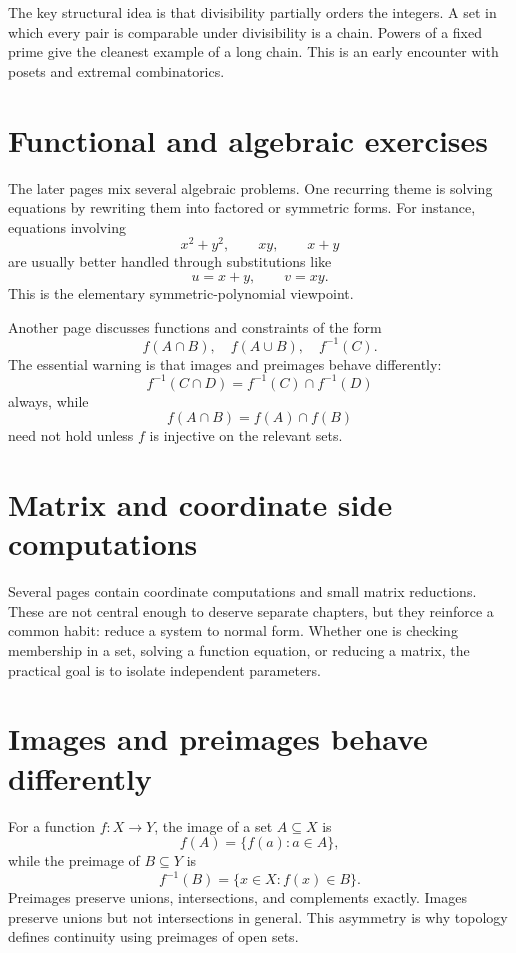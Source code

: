 The key structural idea is that divisibility partially orders the integers.  A set in which every pair is comparable under divisibility is a chain.  Powers of a fixed prime give the cleanest example of a long chain.  This is an early encounter with posets and extremal combinatorics.

\section{Functional and algebraic exercises}

The later pages mix several algebraic problems.  One recurring theme is solving equations by rewriting them into factored or symmetric forms.  For instance, equations involving
\[
  x^2+y^2,\qquad xy,\qquad x+y
\]
are usually better handled through substitutions like
\[
  u=x+y,\qquad v=xy.
\]
This is the elementary symmetric-polynomial viewpoint.

Another page discusses functions and constraints of the form
\[
  f(A\cap B),\quad f(A\cup B),\quad f^{-1}(C).
\]
The essential warning is that images and preimages behave differently:
\[
  f^{-1}(C\cap D)=f^{-1}(C)\cap f^{-1}(D)
\]
always, while
\[
  f(A\cap B)=f(A)\cap f(B)
\]
need not hold unless \(f\) is injective on the relevant sets.

\section{Matrix and coordinate side computations}

Several pages contain coordinate computations and small matrix reductions.  These are not central enough to deserve separate chapters, but they reinforce a common habit: reduce a system to normal form.  Whether one is checking membership in a set, solving a function equation, or reducing a matrix, the practical goal is to isolate independent parameters.


\section{Images and preimages behave differently}

For a function \(f:X\to Y\), the image of a set \(A\subseteq X\) is
\[
  f(A)=\{f(a):a\in A\},
\]
while the preimage of \(B\subseteq Y\) is
\[
  f^{-1}(B)=\{x\in X:f(x)\in B\}.
\]
Preimages preserve unions, intersections, and complements exactly.  Images preserve unions but not intersections in general.  This asymmetry is why topology defines continuity using preimages of open sets.

